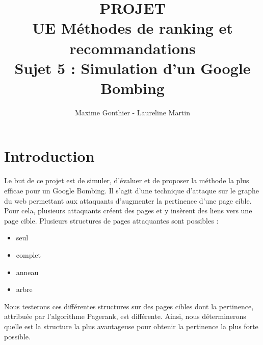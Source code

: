 \documentclass[a4paper,11pt]{article}
\title{PROJET\\ UE Méthodes de ranking et recommandations\\ 
		Sujet 5 : Simulation d'un Google Bombing}
\author{Maxime Gonthier - Laureline Martin}
\begin{document}
\clearpage
	\clearpage
	\maketitle
	\newpage\clearpage{}

\newpage
\tableofcontents

\newpage
\section{Introduction}
	Le but de ce projet est de simuler, d'évaluer et de proposer la méthode la plus efficae pour un Google Bombing. Il s'agit d'une technique d'attaque sur le graphe du web permettant aux attaquants d'augmenter la pertinence d'une page cible.\\
	Pour cela, plusieurs attaquants créent des pages et y insèrent des liens vers une page cible. Plusieurs structures de pages attaquantes sont possibles :
	\begin{itemize}
		\item seul
		\item complet
		\item anneau
		\item arbre
	\end{itemize}
	Nous testerons ces différentes structures sur des pages cibles dont la pertinence, attribuée par l'algorithme Pagerank, est différente. Ainsi, nous déterminerons quelle est la structure la plus avantageuse pour obtenir la pertinence la plus forte possible.
\end{document}
